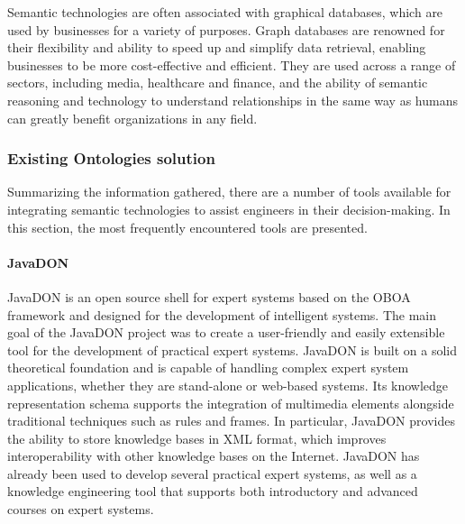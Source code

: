             Semantic technologies are often associated with graphical databases, which are used by businesses for a variety of purposes. Graph databases are renowned for their flexibility and ability to speed up and simplify data retrieval, enabling businesses to be more cost-effective and efficient. They are used across a range of sectors, including media, healthcare and finance, and the ability of semantic reasoning and technology to understand relationships in the same way as humans can greatly benefit organizations in any field.\\
        
        \subsubsection{Existing Ontologies solution\label{sec:exonto}}
        Summarizing the information gathered, there are a number of tools available for integrating semantic technologies to assist engineers in their decision-making. In this section, the most frequently encountered tools are presented.
        
            \paragraph{JavaDON}
            JavaDON is an open source shell for expert systems based on the OBOA framework and designed for the development of intelligent systems. The main goal of the JavaDON project was to create a user-friendly and easily extensible tool for the development of practical expert systems. JavaDON is built on a solid theoretical foundation and is capable of handling complex expert system applications, whether they are stand-alone or web-based systems. Its knowledge representation schema supports the integration of multimedia elements alongside traditional techniques such as rules and frames. In particular, JavaDON provides the ability to store knowledge bases in XML format, which improves interoperability with other knowledge bases on the Internet. JavaDON has already been used to develop several practical expert systems, as well as a knowledge engineering tool that supports both introductory and advanced courses on expert systems.
        
